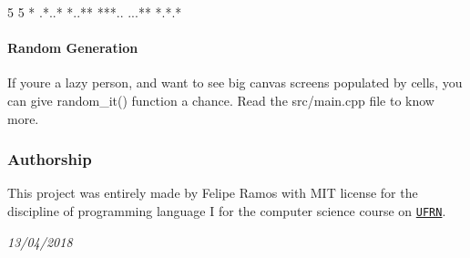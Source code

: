 \begin{DoxyCode}
5 5
*
.*..*
*..**
***..
...**
*.*.*
\end{DoxyCode}


\paragraph*{Random Generation}

If you\textquotesingle{}re a lazy person, and want to see big canvas screens populated by cells, you can give {\ttfamily random\+\_\+it()} function a chance. Read the {\ttfamily src/main.\+cpp} file to know more.

\subsubsection*{Authorship}

This project was entirely made by Felipe Ramos with M\+IT license for the discipline of programming language I for the computer science course on \href{http://ufrn.br}{\tt U\+F\+RN}.

{\itshape 13/04/2018} 